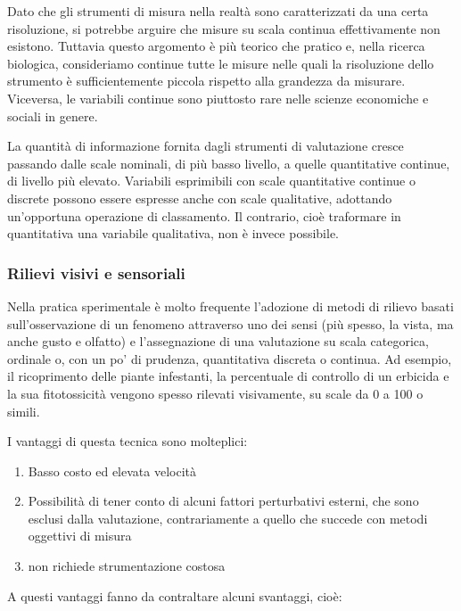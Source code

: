 \documentclass[a4paper,12pt,oneside]{book}
\providecommand{\tightlist}{%
  \setlength{\itemsep}{0pt}\setlength{\parskip}{0pt}}
\begin{document}
Dato che gli strumenti di misura nella realtà sono caratterizzati da una
certa risoluzione, si potrebbe arguire che misure su scala continua
effettivamente non esistono. Tuttavia questo argomento è più teorico che
pratico e, nella ricerca biologica, consideriamo continue tutte le
misure nelle quali la risoluzione dello strumento è sufficientemente
piccola rispetto alla grandezza da misurare. Viceversa, le variabili
continue sono piuttosto rare nelle scienze economiche e sociali in
genere.

La quantità di informazione fornita dagli strumenti di valutazione
cresce passando dalle scale nominali, di più basso livello, a quelle
quantitative continue, di livello più elevato. Variabili esprimibili con
scale quantitative continue o discrete possono essere espresse anche con
scale qualitative, adottando un'opportuna operazione di classamento. Il
contrario, cioè traformare in quantitativa una variabile qualitativa,
non è invece possibile.

\subsubsection{Rilievi visivi e
sensoriali}\label{rilievi-visivi-e-sensoriali}

Nella pratica sperimentale è molto frequente l'adozione di metodi di
rilievo basati sull'osservazione di un fenomeno attraverso uno dei sensi
(più spesso, la vista, ma anche gusto e olfatto) e l'assegnazione di una
valutazione su scala categorica, ordinale o, con un po' di prudenza,
quantitativa discreta o continua. Ad esempio, il ricoprimento delle
piante infestanti, la percentuale di controllo di un erbicida e la sua
fitotossicità vengono spesso rilevati visivamente, su scale da 0 a 100 o
simili.

I vantaggi di questa tecnica sono molteplici:

\begin{enumerate}
\def\labelenumi{\arabic{enumi}.}
\tightlist
\item
  Basso costo ed elevata velocità
\item
  Possibilità di tener conto di alcuni fattori perturbativi esterni, che
  sono esclusi dalla valutazione, contrariamente a quello che succede
  con metodi oggettivi di misura
\item
  non richiede strumentazione costosa
\end{enumerate}

A questi vantaggi fanno da contraltare alcuni svantaggi, cioè:
\end{document}
